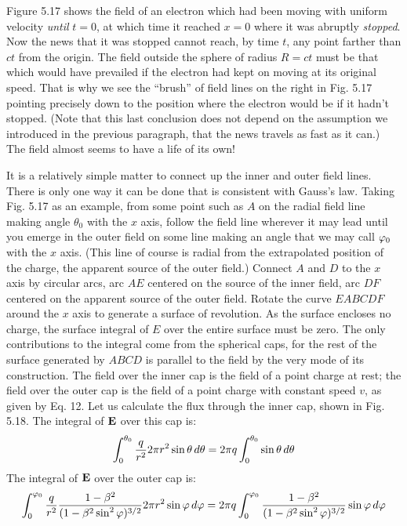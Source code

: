 Figure 5.17 shows the field of an electron which had been moving
with uniform velocity \emph{until} $t = 0$, at which time it reached $x = 0$
where it was abruptly \emph{stopped}. Now the news that it was stopped
cannot reach, by time $t$, any point farther than $ct$ from the origin.
The field outside the sphere of radius $R = ct$ must be that which
would have prevailed if the electron had kept on moving at its original
speed. That is why we see the ``brush'' of field lines on the right
in Fig. 5.17 pointing precisely down to the position where the electron
would be if it hadn't stopped. (Note that this last conclusion
does not depend on the assumption we introduced in the previous
paragraph, that the news travels as fast as it can.) The field almost
seems to have a life of its own!

It is a relatively simple matter to connect up the inner and outer
field lines. There is only one way it can be done that is consistent
with Gauss's law. Taking Fig. 5.17 as an example, from some point
such as $A$ on the radial field line making angle $\theta_0$ with the $x$ axis,
follow the field line wherever it may lead until you emerge in the
outer field on some line making an angle that we may call $\varphi_0$ with
the $x$ axis. (This line of course is radial from the extrapolated position
of the charge, the apparent source of the outer field.) Connect
$A$ and $D$ to the $x$ axis by circular arcs, arc $AE$ centered on the source
of the inner field, arc $DF$ centered on the apparent source of the
outer field. Rotate the curve $EABCDF$ around the $x$ axis to generate
a surface of revolution. As the surface encloses no charge, the surface
integral of $E$ over the entire surface must be zero. The only
contributions to the integral come from the spherical caps, for the
rest of the surface generated by $ABCD$ is parallel to the field by the
very mode of its construction. The field over the inner cap is the
field of a point charge at rest; the field over the outer cap is the field
of a point charge with constant speed $v$, as given by Eq. 12. Let us
calculate the flux through the inner cap, shown in Fig. 5.18. The
integral of $\mathbf{E}$ over this cap is:
\begin{equation}
  \int_0^{\theta_0} \frac{q}{r^2} 2\pi r^2\sin\theta\mathop{d\!}\theta
              = 2\pi q \int_0^{\theta_0} \sin\theta\mathop{d\!}\theta
\end{equation}
The integral of $\mathbf{E}$ over the outer cap is:
\begin{equation}
  \int_0^{\varphi_0} \frac{q}{r^2} \frac{1-\beta^2}{(1-\beta^2\sin^2\varphi)^{3/2}} 2\pi r^2\sin\varphi\mathop{d\!}\varphi
       = 2\pi q \int_0^{\varphi_0} \frac{1-\beta^2}{(1-\beta^2\sin^2\varphi)^{3/2}} \sin\varphi\mathop{d\!}\varphi
\end{equation}
